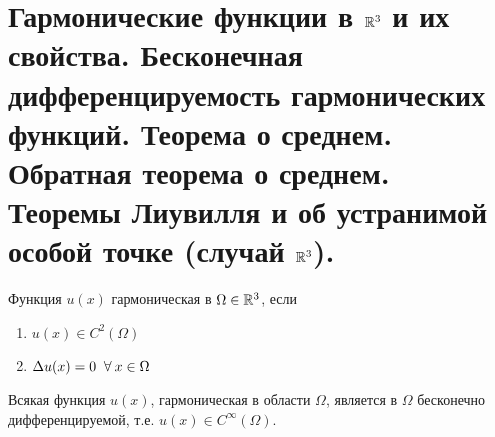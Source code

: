 \section{Гармонические функции в $\mathbb{R}^3$ и их свойства. Бесконечная дифференцируемость гармонических функций. Теорема о среднем. Обратная теорема о среднем. Теоремы Лиувилля и об устранимой особой точке (случай $\mathbb{R}^3$).}
\begin{definition} Функция $u(x)$ гармоническая в $\Omega \in \mathbb{R}^3$, если 
\begin{enumerate}
\item $u(x) \in C^2 (\Omega)$
\item $\Delta u(x) = 0 \;\;\forall\: x \in \Omega$ 
\end{enumerate}
\end{definition}
\begin{theorem}
Всякая функция $u(x)$, гармоническая в области $\Omega$, является в $\Omega$ бесконечно дифференцируемой, т.е. $u(x) \in C^{\infty}(\Omega).$
\end{theorem}
